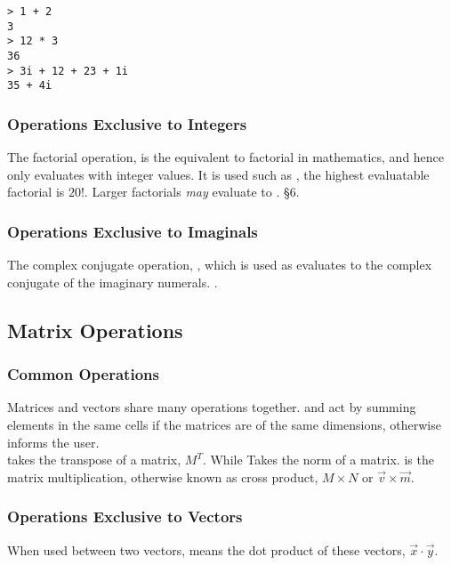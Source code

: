 \documentclass[11pt,a4paper]{book}
\begin{document}
\begin{lstlisting}[caption={Example usages of operations}, captionpos=b]
> 1 + 2
3
> 12 * 3
36
> 3i + 12 + 23 + 1i
35 + 4i
\end{lstlisting}

\subsubsection{Operations Exclusive to Integers}

The factorial operation, \code{!} is the equivalent to factorial in mathematics, and hence only evaluates with integer values. It is used such as , the highest evaluatable factorial is $20!$. Larger factorials \textit{may} evaluate to . \S 6.

\subsubsection{Operations Exclusive to Imaginals}

The complex conjugate operation, \code{\textbackslash}, which is used as  evaluates to the complex conjugate of the imaginary numerals. .

\subsection{Matrix Operations}

\subsubsection{Common Operations}

Matrices and vectors share many operations together. \code{+} and \code{-} act by summing elements in the same cells if the matrices are of the same dimensions, otherwise informs the user. \\

\code{\textbackslash} takes the transpose of a matrix, $M^T$. While \code{||} Takes the norm of a matrix. \code{\&} is the matrix multiplication, otherwise known as cross product, $M \times N$ or $\vec{v} \times \vec{m}$.

\subsubsection{Operations Exclusive to Vectors}

When used between two vectors, \code{*} means the dot product of these vectors, $\vec{x} \cdot \vec{y}$.
\end{document}
